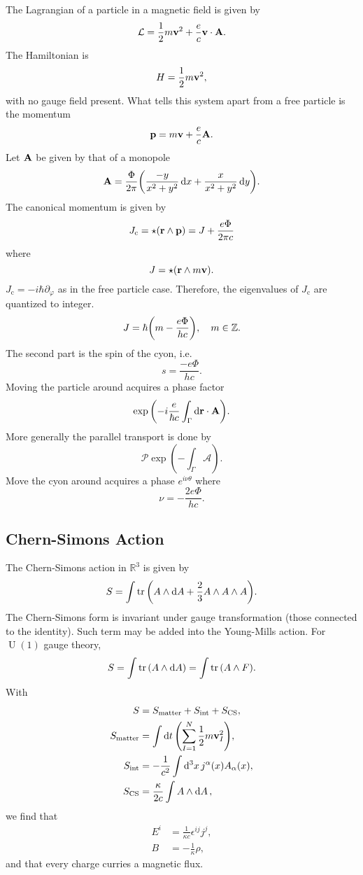 \documentclass{article}
\begin{document}
The Lagrangian of a particle in a magnetic field is given by
\[ \mathcal{L} = \frac{1}{2}m\vb{v}^2 + \frac{e}{c}\vb{v}\cdot \vb{A}. \]
The Hamiltonian is
\[ H = \frac{1}{2} m \vb{v}^2, \]
with no gauge field present.
What tells this system apart from a free particle is the momentum
\[ \vb{p} = m\vb{v} + \frac{e}{c} \vb{A}. \]
Let $\vb{A}$ be given by that of a monopole
\[ \vb{A} = \frac{\Phi}{2\pi} \qty(\frac{-y}{x^2 + y^2} \dd{x} + \frac{x}{x^2 + y^2}\dd{y}). \]
The canonical momentum is given by
\[ J_{\mathrm{c}} = \star(\vb{r} \wedge \vb{p}) = J + \frac{e\Phi}{2\pi c} \]
where
\[ J = \star(\vb{r}\wedge m\vb{v}). \]
$J_{\mathrm{c}} = -i\hbar \partial_\varphi$ as in the free particle case.
Therefore, the eigenvalues of $J_{\mathrm{c}}$ are quantized to integer.
\[ J = \hbar\qty(m - \frac{e\Phi}{hc}),\quad m\in\mathbb{Z}. \]
The second part is the spin of the cyon, i.e.
\[ s = \frac{-e\Phi}{hc}. \]
Moving the particle around acquires a phase factor
\[ \exp\qty(-i \frac{e}{\hbar c} \int_\Gamma \dd{\vb{r}}\cdot \vb{A}). \]
More generally the parallel transport is done by
\[ \mathcal{P} \exp(-\int_\Gamma \mathcal{A}). \]
Move the cyon around acquires a phase $e^{i\nu\theta}$ where
\[ \nu = -\frac{2e\Phi}{hc}. \]

\subsection{Chern-Simons Action}
The Chern-Simons action in $\mathbb{R}^3$ is given by
\[ S = \int \tr\qty(A \wedge \dd{A} + \frac{2}{3}A\wedge A \wedge A). \]
The Chern-Simons form is invariant under gauge transformation (those connected to the identity).
Such term may be added into the Young-Mills action.
For $\operatorname{U}(1)$ gauge theory,
\[ S = \int \tr\qty(A\wedge \dd{A}) = \int \tr\qty(A\wedge F). \]
With
\begin{align*}
    S &= S_{\mathrm{matter}} + S_{\mathrm{int}} + S_{\mathrm{CS}}, \\
    S_{\mathrm{matter}} &= \int \dd{t} \qty(\sum_{I=1}^N \frac{1}{2} m\vb{v}_I^2), \\
    S_{\mathrm{int}} &= -\frac{1}{c^2} \int \dd[3]{x} j^\alpha(x) A_\alpha(x), \\
    S_{\mathrm{CS}} &= \frac{\kappa}{2c} \int A \wedge \dd{A},
\end{align*}
we find that
\begin{align*}
    E^i &= \frac{1}{\kappa c} \epsilon^{ij} j^j, \\
    B &= -\frac{1}{\kappa} \rho,
\end{align*}
and that every charge curries a magnetic flux.
\end{document}
